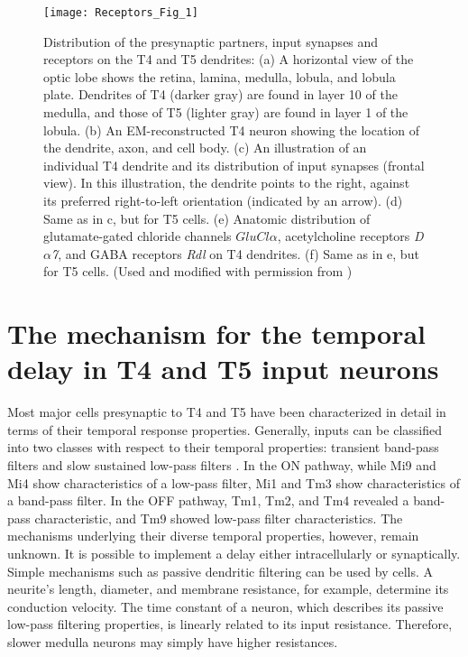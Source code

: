 \begin{figure}
\centering
\hspace*{-1cm} 
\texttt{[image: Receptors\_Fig\_1]}
\caption[Distribution of the presynaptic partners, input synapses and receptors on the T4 and T5 dendrites] {Distribution of the presynaptic partners, input synapses and receptors on the T4 and T5 dendrites: (a) A horizontal view of the optic lobe shows the retina, lamina, medulla, lobula, and lobula plate. Dendrites of T4 (darker gray) are found in layer 10 of the medulla, and those of T5 (lighter gray) are found in layer 1 of the lobula. (b) An EM-reconstructed T4 neuron showing the location of the dendrite, axon, and cell body. (c) An illustration of an individual T4 dendrite and its distribution of input synapses (frontal view). In this illustration, the dendrite points to the right, against its preferred right-to-left orientation (indicated by an arrow). (d) Same as in c, but for T5 cells. (e) Anatomic distribution of glutamate-gated chloride channels \textit{$GluCl\alpha$}, acetylcholine receptors \textit{D$\alpha$7}, and GABA receptors \textit{Rdl} on T4 dendrites. (f) Same as in e, but for T5 cells. (Used and modified with permission from \parencite{Fendl2020})} 
\label{fig:receptors}
\end{figure}

\section{The mechanism for the temporal delay in T4 and T5 input neurons}
Most major cells presynaptic to T4 and T5 have been characterized in detail in terms of their temporal response properties. Generally, inputs can be classified into two classes with respect to their temporal properties: transient band-pass filters and slow sustained low-pass filters \parencite{Arenz2017, Serbe2016, Behnia2014}. In the ON pathway, while Mi9 and Mi4 show characteristics of a low-pass filter, Mi1 and Tm3 show characteristics of a band-pass filter. In the OFF pathway, Tm1, Tm2, and Tm4 revealed a band-pass characteristic, and Tm9 showed low-pass filter characteristics. The mechanisms underlying their diverse temporal properties, however, remain unknown. It is possible to implement a delay either intracellularly or synaptically. Simple mechanisms such as passive dendritic filtering can be used by cells. A neurite's length, diameter, and membrane resistance, for example, determine its conduction velocity. The time constant of a neuron, which describes its passive low-pass filtering properties, is linearly related to its input resistance. Therefore, slower medulla neurons may simply have higher resistances.

